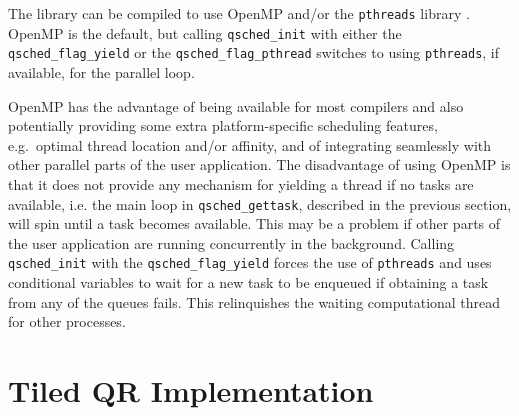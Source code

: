 \documentclass[preprint]{elsarticle}
\begin{document}
The library can be compiled to use OpenMP and/or the
{\tt pthreads} library \cite{ref:Pthreads1995}.
OpenMP is the default, but calling {\tt qsched\_init} with
either the {\tt qsched\_flag\_yield}
or the {\tt qsched\_flag\_pthread} switches to using {\tt pthreads},
if available, for the parallel loop.

OpenMP has the advantage of being available for most compilers
and also potentially providing some extra platform-specific
scheduling features, e.g.~optimal thread location and/or affinity,
and of integrating seamlessly with other parallel parts of the
user application.
The disadvantage of using OpenMP is that it does not provide
any mechanism for yielding a thread if no tasks are available,
i.e. the main loop in {\tt qsched\_gettask}, described in the
previous section, will spin until a task becomes available.
This may be a problem if other parts of the user application
are running concurrently in the background.
Calling {\tt qsched\_init} with the {\tt qsched\_flag\_yield}
forces the use of {\tt pthreads} and uses conditional variables
to wait for a new task to be enqueued if obtaining a task
from any of the queues fails.
This relinquishes the waiting computational thread for other
processes.


\section{Tiled QR Implementation}
\end{document}
